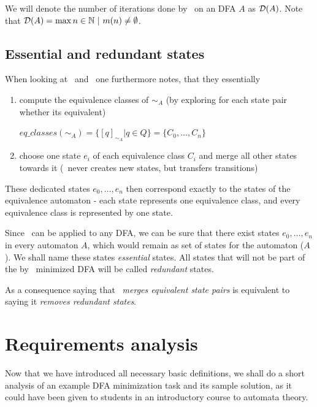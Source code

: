 We will denote the number of iterations done by \CompDist\ on an DFA $A$ as $\mathcal{D}(A)$. Note that $\mathcal{D}(A) = \max n \in \mathbb{N}\ |\ m(n) \neq \emptyset$. 

\subsection{Essential and redundant states}

When looking at \CompDist\ and \RemEq\ one furthermore notes, that they essentially
\begin{enumerate}
	\item compute the equivalence classes of $\sim_A$ (by exploring for each state pair whether its equivalent)
	
	$eq\_classes(\sim_A) = \{ [q]_{\sim_A} | q \in Q \} = \{C_0,\ldots,C_n\}$
	\item choose one state $e_i$ of each equivalence class $C_i$ and merge all other states towards it (\RemEq\ never creates new states, but transfers transitions)
\end{enumerate}
These dedicated states $e_0, \ldots, e_n$ then correspond exactly to the states of the equivalence automaton - each state represents one equivalence class, and every equivalence class is represented by one state.

Since \MinAlg\ can be applied to any DFA, we can be sure that there exist states $e_0, \ldots, e_n$ in every automaton $A$, which would remain as set of states for the automaton \MinAlg($A$). We shall name these states \emph{essential} states. All states that will not be part of the by \MinAlg\ minimized DFA will be called \emph{redundant} states.


As a consequence saying that \RemEq\ \emph{merges equivalent state pairs} is equivalent to saying it \emph{removes redundant states}.

\section{Requirements analysis}

Now that we have introduced all necessary basic definitions, we shall do a short analysis of an example DFA minimization task and its sample solution, as it could have been given to students in an introductory course to automata theory.

